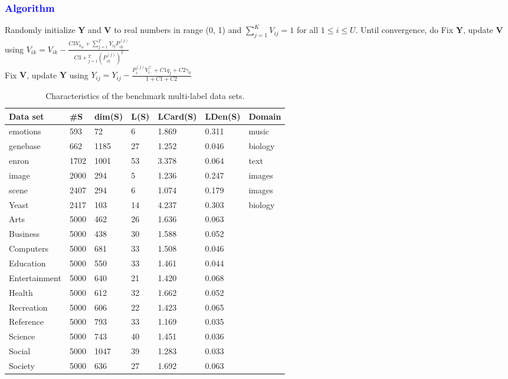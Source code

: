 \documentclass{beamer}
\begin{document}
\begin{frame}
\frametitle{\textcolor{blue}{Algorithm}}
\begin{algorithm}[H]
\begin{algorithmic}[1]
\STATE Randomly initialize $\textbf{Y}$ and $\textbf{V}$ to real numbers in range (0, 1) and $\displaystyle\sum_{j=1}^{K}V_{ij} = 1$ for all $1 \leq i \leq U$.
\STATE Until convergence, do
	\STATE \qquad Fix $\textbf{Y}$, update $\textbf{V}$ using $V_{ik} =V_{ik} -  \frac{C3V_{0_{ik}} + \displaystyle\sum_{j=1}^T Y_{ij}P_{ik}^{(j)}}{C3 + \displaystyle_{j=1}^{T}(P_{ik}^{(j)})^2}$ \\[0.5cm]

	\STATE \qquad Fix $\textbf{V}$, update $\textbf{Y}$ using  $Y_{ij} = Y_{ij} - \frac{P_{i\cdot}^{(j)}V_{i\cdot}^\top + C1q_j + C2\gamma_0}{1 + C1 + C2}$

\end{algorithmic}
\end{algorithm}
\end{frame}




\begin{frame}[plain]\small
\begin{table}[h]
\centering
\caption{Characteristics of the benchmark multi-label data sets.}
\begin{tabular}{lllllll}
\hline
\hline
Data set & \#S & dim(S)& L(S) & LCard(S) & LDen(S) & Domain\\
\hline

emotions & 593&72 & 6&1.869& 0.311&music\\
genebase & 662&1185 &  27&1.252 &0.046&biology\\
enron & 1702& 1001 & 53& 3.378& 0.064&text\\
image & 2000&294&  5&1.236 & 0.247&images\\
scene & 2407&294& 6& 1.074 & 0.179& images\\
Yeast & 2417 &103& 14 & 4.237 & 0.303& biology\\
\hline
Arts & 5000 & 462 & 26 & 1.636 & 0.063 &\\
Business & 5000& 438 & 30& 1.588 & 0.052&\\
Computers & 5000&681 &  33&1.508 &0.046& \\
Education & 5000& 550 & 33&1.461&0.044&\\
Entertainment & 5000&640 &  21&1.420 & 0.068& \\
Health & 5000&612&  32&1.662&0.052&\\
Recreation & 5000&606 & 22&1.423 & 0.065& \\
Reference & 5000&793 &  33&1.169 &0.035& \\
Science & 5000&743& 40&1.451 &0.036&\\
Social & 5000&1047& 39&1.283 &  0.033&\\
Society & 5000&636& 27&1.692& 0.063&\\
\hline
\hline
\end{tabular}
\end{table}

\end{frame}
\end{document}
